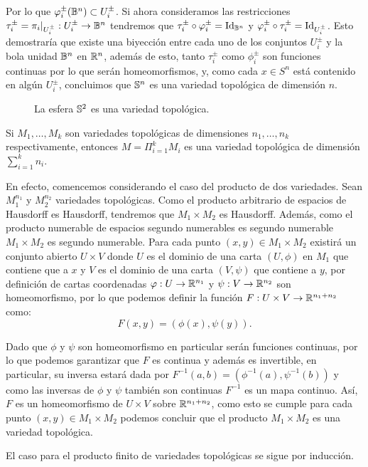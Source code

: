 \begin{example}[$n-$Esfera]
	Por lo que $\phi_i^{\pm}(\B^n) \subset U_{i}^{\pm}$. Si ahora consideramos las restricciones $\tau_i^{\pm} = \pi_i |_{U_i^{\pm}}: U_i^{\pm} \to \B^n$ tendremos que $\tau_i^{\pm} \circ \phi_i^{\pm} = \id_{\B^n}$ y $\phi_i^{\pm} \circ \tau_i^{\pm} = \id_{U_i^{\pm}}$. Esto demostraría que existe una biyección entre cada uno de los conjuntos $U_i^{\pm}$ y la bola unidad $\B^n$ en $\R^n$, además de esto, tanto $\tau_i^{\pm}$ como $\phi_i^{\pm}$ son funciones continuas por lo que serán homeomorfismos, y, como cada $x \in S^n$ está contenido en algún $U_i^{\pm}$, concluimos que $\S^n$ es una variedad topológica de dimensión $n$.
\end{example}

\begin{figure}[h!]
	\centering
	
	\caption{La esfera $\S^{2}$ es una variedad topológica.}
\end{figure}

\begin{example}\label{Ex: Variedad Topologica - Producto de Variedades}
	Si $M_1, \hdots, M_k$ son variedades topológicas de dimensiones $n_1,\hdots,n_k$ respectivamente, entonces $M = \Pi_{i=1}^k M_i$ es una variedad topológica de dimensión $\sum_{i=1}^k n_i$.

	En efecto, comencemos considerando el caso del producto de dos variedades. Sean $M_{1}^{n_1}$ y $M_{2}^{n_2}$ variedades topológicas. Como el producto arbitrario de espacios de Hausdorff es Hausdorff, tendremos que $M_1 \times M_2$ es Hausdorff. Además, como el producto numerable de espacios segundo numerables es segundo numerable $M_1 \times M_2$ es segundo numerable.
	Para cada punto $(x,y) \in M_1 \times M_2$ existirá un conjunto abierto $U \times V$ donde $U$ es el dominio de una carta $(U,\phi)$ en $M_1$ que contiene que a $x$ y $V$ es el dominio de una carta $(V,\psi)$ que contiene a $y$, por definición de cartas coordenadas $\phi: U \to \R^{n_1}$ y $\psi: V \to \R^{n_2}$ son homeomorfismo, por lo que podemos definir la función $F: U \times V \to \R^{n_1 + n_2}$ como:
	\[
		F(x,y) = (\phi(x),\psi(y)).
	\]

	Dado que $\phi$ y $\psi$ son homeomorfismo en particular serán funciones continuas, por lo que podemos garantizar que $F$ es continua y además es invertible, en particular, su inversa estará dada por $F^{-1}(a,b) = (\phi^{-1}(a),\psi^{-1}(b))$ y como las inversas de $\phi$  y $\psi$ también son continuas $F^{-1}$ es un mapa continuo. Así, $F$ es un homeomorfismo de $U \times V$ sobre $\R^{n_1 + n_2}$, como esto se cumple para cada punto $(x,y) \in M_1 \times M_2$ podemos concluir que el producto $M_1 \times M_2$ es una variedad topológica.

	El caso para el producto finito de variedades topológicas se sigue por inducción.
\end{example}

